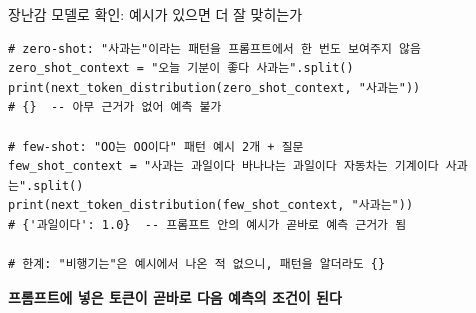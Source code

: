 \begin{frame}[fragile]{장난감 모델로 확인: 예시가 있으면 더 잘 맞히는가}
\begin{lstlisting}
# zero-shot: "사과는"이라는 패턴을 프롬프트에서 한 번도 보여주지 않음
zero_shot_context = "오늘 기분이 좋다 사과는".split()
print(next_token_distribution(zero_shot_context, "사과는"))
# {}  -- 아무 근거가 없어 예측 불가

# few-shot: "OO는 OO이다" 패턴 예시 2개 + 질문
few_shot_context = "사과는 과일이다 바나나는 과일이다 자동차는 기계이다 사과는".split()
print(next_token_distribution(few_shot_context, "사과는"))
# {'과일이다': 1.0}  -- 프롬프트 안의 예시가 곧바로 예측 근거가 됨

# 한계: "비행기는"은 예시에서 나온 적 없으니, 패턴을 알더라도 {}
\end{lstlisting}
  \textbf{프롬프트에 넣은 토큰이 곧바로 다음 예측의 조건이 된다}

\end{frame}
